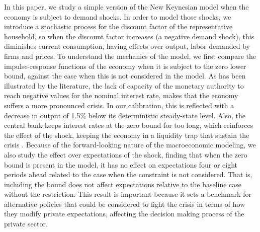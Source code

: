 \documentclass[11pt]{article}
\numberwithin{equation}{section}
\begin{document}
In this paper, we study a simple version of the New Keynesian model when the economy is subject to demand shocks. In order to model those shocks, we introduce a stochastic process for the discount factor of the representative household, so when the discount factor increases (a negative demand shock), this diminishes current consumption, having effects over output, labor demanded by firms and prices. To understand the mechanics of the model, we first compare the impulse-response functions of the economy when it is subject to the zero lower bound, against the case when this is not considered in the model. As has been illustrated by the literature, the lack of capacity of the monetary authority to reach negative values for the nominal interest rate, makes that the economy suffers a more pronounced crisis. In our calibration, this is reflected with a decrease in output of 1.5\% below its deterministic steady-state level. Also, the central bank keeps interest rates at the zero bound for too long, which reinforces the effect of the shock, keeping the economy in a liquidity trap that sustain the crisis \citep{Werning2012}. Because of the forward-looking nature of the macroeconomic modeling, we also study the effect over expectations of the shock, finding that when the zero bound is present in the model, it has no effect on expectations four or eight periods ahead related to the case when the constraint is not considered. That is, including the bound does not affect expectations relative to the baseline case without the restriction. This result is important because it sets a benchmark for alternative policies that could be considered to fight the crisis in terms of how they modify private expectations, affecting the decision making process of the private sector.
\end{document}
